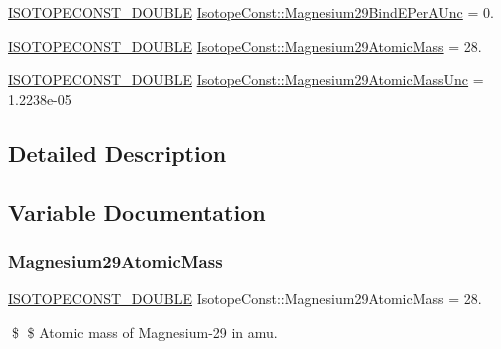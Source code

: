 \begin{DoxyCompactItemize}
\mbox{\hyperlink{group___isotope_const-_macros_ga8f45a7272ce02c0b4c65c44636ed719a}{I\+S\+O\+T\+O\+P\+E\+C\+O\+N\+S\+T\+\_\+\+D\+O\+U\+B\+LE}} \mbox{\hyperlink{group___isotope_const-_magnesium-_mg29_ga39395a7ccf3982932bec4396f95a395a}{Isotope\+Const\+::\+Magnesium29\+Bind\+E\+Per\+A\+Unc}} = 0.
\item 
\mbox{\hyperlink{group___isotope_const-_macros_ga8f45a7272ce02c0b4c65c44636ed719a}{I\+S\+O\+T\+O\+P\+E\+C\+O\+N\+S\+T\+\_\+\+D\+O\+U\+B\+LE}} \mbox{\hyperlink{group___isotope_const-_magnesium-_mg29_gaee38f42bc649b11944894b3f1edb17b1}{Isotope\+Const\+::\+Magnesium29\+Atomic\+Mass}} = 28.
\item 
\mbox{\hyperlink{group___isotope_const-_macros_ga8f45a7272ce02c0b4c65c44636ed719a}{I\+S\+O\+T\+O\+P\+E\+C\+O\+N\+S\+T\+\_\+\+D\+O\+U\+B\+LE}} \mbox{\hyperlink{group___isotope_const-_magnesium-_mg29_gad7ce725836787fae00c131033739182f}{Isotope\+Const\+::\+Magnesium29\+Atomic\+Mass\+Unc}} = 1.\+2238e-\/05
\end{DoxyCompactItemize}


\subsection{Detailed Description}


\subsection{Variable Documentation}
\mbox{\label{group___isotope_const-_magnesium-_mg29_gaee38f42bc649b11944894b3f1edb17b1}} 
\subsubsection{\texorpdfstring{Magnesium29\+Atomic\+Mass}{Magnesium29AtomicMass}}
{\footnotesize\ttfamily \mbox{\hyperlink{group___isotope_const-_macros_ga8f45a7272ce02c0b4c65c44636ed719a}{I\+S\+O\+T\+O\+P\+E\+C\+O\+N\+S\+T\+\_\+\+D\+O\+U\+B\+LE}} Isotope\+Const\+::\+Magnesium29\+Atomic\+Mass = 28.}

\$ \$ Atomic mass of Magnesium-\/29 in amu. \mbox{\label{group___isotope_const-_magnesium-_mg29_gad7ce725836787fae00c131033739182f}} 
